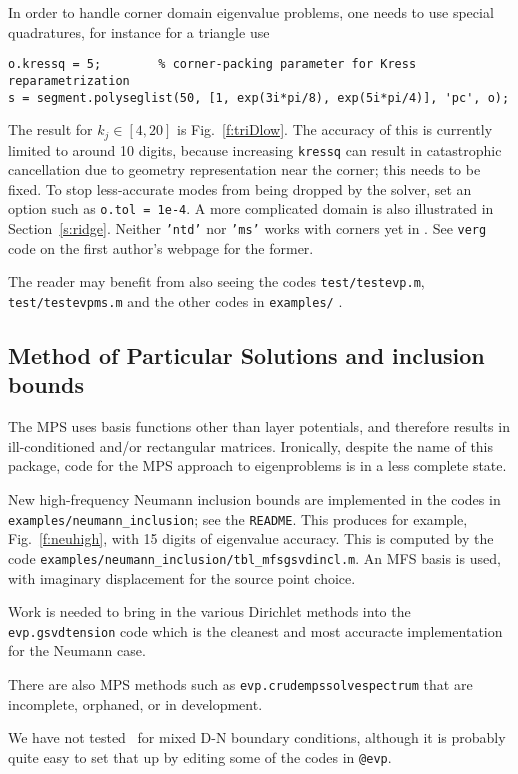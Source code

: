 In order to handle corner domain eigenvalue problems, one needs to
use special quadratures,
for instance for a triangle use
\begin{verbatim}
o.kressq = 5;        % corner-packing parameter for Kress reparametrization
s = segment.polyseglist(50, [1, exp(3i*pi/8), exp(5i*pi/4)], 'pc', o);
\end{verbatim}
The result for $k_j \in [4,20]$ is Fig.~\ref{f:triDlow}.
The accuracy of this is currently limited to around 10 digits,
because increasing {\tt kressq}
can result in catastrophic cancellation due to geometry representation
near the corner; this needs to be fixed.
To stop less-accurate modes from being dropped by the solver,
set an option such as
{\tt o.tol = 1e-4}.
A more complicated domain is also illustrated in Section~\ref{s:ridge}.
Neither {\tt 'ntd'} nor {\tt 'ms'} works with corners yet in \mpspack.
See {\tt verg} code on the first author's webpage for the former.

The reader may benefit from also seeing the
codes {\tt test/testevp.m}, {\tt test/testevpms.m}
and the other codes in {\tt examples/} .





\bfi %
\efi

\subsection{Method of Particular Solutions and inclusion bounds}

The MPS \cite{mps}
uses basis functions other than layer potentials, and therefore
results in ill-conditioned and/or rectangular matrices.
Ironically, despite the name of this package,
code for the MPS approach to eigenproblems is in a less complete state.

New high-frequency Neumann inclusion bounds
\cite{ninc}
are implemented in the codes in \verb+examples/neumann_inclusion+;
see the {\tt README}. This produces for example, Fig.~\ref{f:neuhigh},
with 15 digits of eigenvalue accuracy.
This is computed by the code \verb+examples/neumann_inclusion/tbl_mfsgsvdincl.m+.
An MFS basis is used, with imaginary displacement for the source point choice.

Work is needed to bring in the various Dirichlet methods into the
{\tt evp.gsvdtension} code which is the cleanest and most accuracte
implementation for the Neumann case.

There are also MPS methods such as {\tt evp.crudempssolvespectrum}
that are incomplete, orphaned, or in development.

We have not tested \mpspack\ for mixed D-N boundary conditions, although
it is probably quite easy to set that up by editing some of the
codes in {\tt @evp}.


